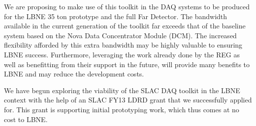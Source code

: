We are proposing to make use of this toolkit in the DAQ systems to be produced
for the LBNE 35 ton prototype and the full Far Detector.
The bandwidth available in the current generation of the toolkit far
exceeds that of the baseline system based on the Nova Data Concentrator 
Module (DCM).
The increased flexibility afforded by this extra bandwidth may be highly valuable to 
ensuring LBNE success.
Furthermore, leveraging the work already done by the REG as well as benefitting from
their support in the future, will provide many benefits to LBNE and may reduce
the development costs.

We have begun exploring the viability of the SLAC DAQ toolkit in the LBNE
context with the help of 
an SLAC FY13 LDRD grant that we successfully applied for.
This grant is supporting initial prototyping work, which thus comes at no cost
to LBNE. 